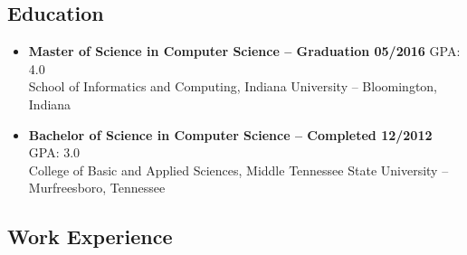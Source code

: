 \documentclass[12pt,letterpaper]{article}
\begin{document}
\subsection*{Education}

\begin{itemize}
	\item \textbf{Master of Science in Computer Science -- Graduation 05/2016}
	\hfill{GPA: 4.0} \\
	School of Informatics and Computing, Indiana University -- Bloomington, Indiana

	\item \textbf{Bachelor of Science in Computer Science -- Completed 12/2012}
	\hfill{GPA: 3.0 }\\
	College of Basic and Applied Sciences, Middle Tennessee State University -- Murfreesboro, Tennessee
\end{itemize}


\subsection*{Work Experience}
\end{document}
